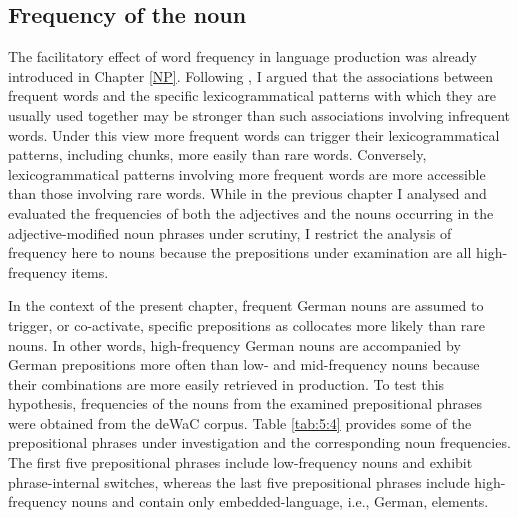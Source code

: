 \subsection{Frequency of the noun}

The facilitatory effect of word frequency in language production was already introduced in Chapter \ref{NP}. Following \citet[115]{macwhinney1997}, I argued that the associations between frequent words and the specific lexicogrammatical patterns with which they are usually used together may be stronger than such associations involving infrequent words. Under this view more frequent words can trigger their lexicogrammatical patterns, including chunks, more easily than rare words. Conversely, lexicogrammatical patterns involving more frequent words are more accessible than those involving rare words. While in the previous chapter I analysed and evaluated the frequencies of both the adjectives and the nouns occurring in the adjective-modified noun phrases under scrutiny, I restrict the analysis of frequency here to nouns because the prepositions under examination are all high-frequency items. 

In the context of the present chapter, frequent German nouns are assumed to trigger, or co-activate, specific prepositions as collocates more likely than rare nouns. In other words, high-frequency German nouns are accompanied by German prepositions more often than low- and mid-frequency nouns because their combinations are more easily retrieved in production. To test this hypothesis, frequencies of the nouns from the examined prepositional phrases were obtained from the deWaC corpus. Table \ref{tab:5:4} provides some of the prepositional phrases under investigation and the corresponding noun frequencies. The first five prepositional phrases include low-frequency nouns and exhibit phrase-internal switches, whereas the last five prepositional phrases include high-fre\-quen\-cy nouns and contain only embedded-language, i.e., German, elements.

